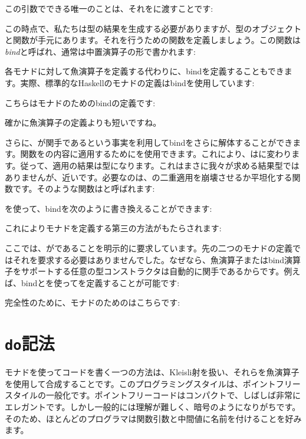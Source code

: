 この引数でできる唯一のことは、それをに渡すことです: 

この時点で、私たちは型の結果を生成する必要がありますが、型のオブジェクトと関数が手元にあります。それを行うための関数を定義しましょう。この関数は\emph{bind}と呼ばれ、通常は中置演算子の形で書かれます: 

各モナドに対して魚演算子を定義する代わりに、bindを定義することもできます。実際、標準的なHaskellのモナドの定義はbindを使用しています: 

こちらはモナドのためのbindの定義です: 

確かに魚演算子の定義よりも短いですね。

さらに、が関手であるという事実を利用してbindをさらに解体することができます。関数をの内容に適用するためにを使用できます。これにより、はに変わります。従って、適用の結果は型になります。これはまさに我々が求める結果型ではありませんが、近いです。必要なのは、の二重適用を崩壊させるか平坦化する関数です。そのような関数はと呼ばれます: 

を使って、bindを次のように書き換えることができます: 

これによりモナドを定義する第三の方法がもたらされます: 

ここでは、がであることを明示的に要求しています。先の二つのモナドの定義ではそれを要求する必要はありませんでした。なぜなら、魚演算子またはbind演算子をサポートする任意の型コンストラクタは自動的に関手であるからです。例えば、bindとを使ってを定義することが可能です: 

完全性のために、モナドのためのはこちらです: 


\section{\texttt{do}記法}

モナドを使ってコードを書く一つの方法は、Kleisli射を扱い、それらを魚演算子を使用して合成することです。このプログラミングスタイルは、ポイントフリースタイルの一般化です。ポイントフリーコードはコンパクトで、しばしば非常にエレガントです。しかし一般的には理解が難しく、暗号のようになりがちです。そのため、ほとんどのプログラマは関数引数と中間値に名前を付けることを好みます。

